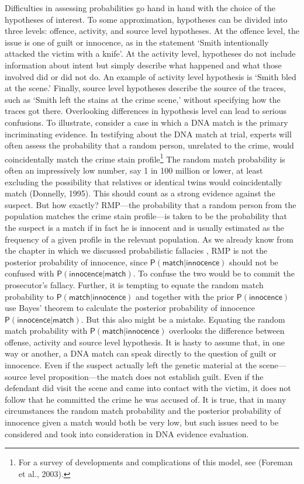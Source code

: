 \documentclass[10pt,dvipsnames,enabledeprecatedfontcommands]{scrartcl}
\newcommand{\pr}[1]{\mathsf{P}(#1)}
\begin{document}
Difficulties in assessing probabilities go hand in hand with the choice
of the hypotheses of interest. To some approximation, hypotheses can be
divided into three levels: offence, activity, and source level
hypotheses. At the offence level, the issue is one of guilt or
innocence, as in the statement `Smith intentionally attacked the victim
with a knife'. At the activity level, hypotheses do not include
information about intent but simply describe what happened and what
those involved did or did not do. An example of activity level
hypothesis is `Smith bled at the scene.' Finally, source level
hypotheses describe the source of the traces, such as `Smith left the
stains at the crime scene,' without specifying how the traces got there.
Overlooking differences in hypothesis level can lead to serious
confusions. To illustrate, consider a case in which a DNA match is the
primary incriminating evidence. In testifying about the DNA match at
trial, experts will often assess the probability that a random person,
unrelated to the crime, would coincidentally match the crime stain
profile\footnote{For a survey of developments and complications of this
  model, see (Foreman et al., 2003).} The random match probability is
often an impressively low number, say 1 in 100 million or lower, at
least excluding the possibility that relatives or identical twins would
coincidentally match (Donnelly, 1995). This should count as a strong
evidence against the suspect. But how exactly? RMP---the probability
that a random person from the population matches the crime stain
profile---is taken to be the probability that the suspect is a match if
in fact he is innocent and is usually estimated as the frequency of a
given profile in the relevant population. As we already know from the
chapter in which we discussed probabilistic fallacies ,
RMP is not the posterior probability of innocence, since
\(\pr{\textsf{match} \vert \textsf{innocence}}\) should not be confused
with \(\pr{\textsf{innocence} \vert \textsf{match}}\). To confuse the
two would be to commit the prosecutor's fallacy. Further, it is tempting
to equate the random match probability to
\(\pr{\textsf{match} \vert \textsf{innocence}}\) and together with the
prior \(\pr{\textsf{innocence}}\) use Bayes' theorem to calculate the
posterior probability of innocence
\(\pr{\textsf{innocence} \vert \textsf{match}}\). But this also might be
a mistake. Equating the random match probability with
\(\pr{\textsf{match} \vert \textsf{innocence}}\) overlooks the
difference between offense, activity and source level hypothesis. It is
hasty to assume that, in one way or another, a DNA match can speak
directly to the question of guilt or innocence. Even if the suspect
actually left the genetic material at the scene---source level
proposition---the match does not establish guilt. Even if the defendant
did visit the scene and came into contact with the victim, it does not
follow that he committed the crime he was accused of. It is true, that
in many circumstances the random match probability and the posterior
probability of innocence given a match would both be very low, but such
issues need to be considered and took into consideration in DNA evidence
evaluation.
\end{document}
